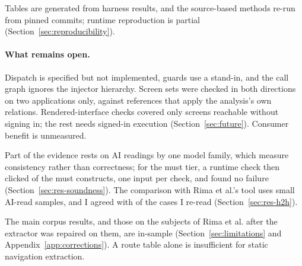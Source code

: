Tables are generated from harness results, and the source-based methods re-run from pinned
commits; runtime reproduction is partial (Section~\ref{sec:reproducibility}).

\paragraph{What remains open.} Dispatch is specified but not implemented, guards use a stand-in,
and the call graph ignores the injector hierarchy. Screen sets were checked in both directions
on two applications only, against references that apply the analysis's own relations.
Rendered-interface checks covered only screens reachable without signing in; the rest
needs signed-in execution (Section~\ref{sec:future}). Consumer benefit is unmeasured.

Part of the evidence rests on AI readings by one model family, which measure consistency rather
than correctness; for the must tier, a runtime check then clicked \MustRunConfirmedConstructs{} of
the \CensusMustSites{} must constructs, one input per check, and found no failure
(Section~\ref{sec:res-soundness}). The
comparison with Rima et al.'s tool uses small AI-read samples, and I agreed with
\HHAuthorAgree{} of the \HHAuthorJudged{} cases I re-read (Section~\ref{sec:res-h2h}).

The main corpus results, and those on the subjects of Rima et al. after the extractor was repaired on them, are in-sample
(Section~\ref{sec:limitations} and Appendix~\ref{app:corrections}). A route table alone is insufficient for static navigation extraction.
